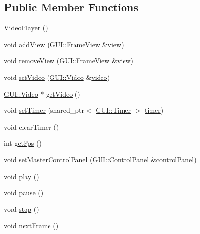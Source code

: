 \subsection*{Public Member Functions}
\begin{DoxyCompactItemize}
\item 
\hyperlink{classGUI_1_1VideoPlayer_af6d7bb082887f6a9738741778c58daf8}{Video\+Player} ()
\item 
void \hyperlink{classGUI_1_1VideoPlayer_a3a9a97f5648a0ddb20c3fcbf061e1986}{add\+View} (\hyperlink{classGUI_1_1FrameView}{G\+U\+I\+::\+Frame\+View} \&view)
\item 
void \hyperlink{classGUI_1_1VideoPlayer_acda9b8aac2ec150de169d44dff398597}{remove\+View} (\hyperlink{classGUI_1_1FrameView}{G\+U\+I\+::\+Frame\+View} \&view)
\item 
void \hyperlink{classGUI_1_1VideoPlayer_a0f9684c4ff31ee8fd5c381a433f56a6d}{set\+Video} (\hyperlink{classGUI_1_1Video}{G\+U\+I\+::\+Video} \&\hyperlink{classGUI_1_1VideoPlayer_a1c4d4daa00ecea5e8390244e057da0df}{video})
\item 
\hyperlink{classGUI_1_1Video}{G\+U\+I\+::\+Video} $\ast$ \hyperlink{classGUI_1_1VideoPlayer_ac9e30918a32b2e3ba7c86eb3f727c0d7}{get\+Video} ()
\item 
void \hyperlink{classGUI_1_1VideoPlayer_ad18697af7e7a6a82b354eb509fb57582}{set\+Timer} (shared\+\_\+ptr$<$ \hyperlink{classGUI_1_1Timer}{G\+U\+I\+::\+Timer} $>$ \hyperlink{classGUI_1_1VideoPlayer_a1653286e46cb3cc5ac65fd1d09d2a113}{timer})
\item 
void \hyperlink{classGUI_1_1VideoPlayer_ac99343fd51cdad1ee430905a00791ade}{clear\+Timer} ()
\item 
int \hyperlink{classGUI_1_1VideoPlayer_a519ad5c0664b9de28c1a6d9dc77f959d}{get\+Fps} ()
\item 
void \hyperlink{classGUI_1_1VideoPlayer_a84dd2c6952a37bd1e2d1582092606740}{set\+Master\+Control\+Panel} (\hyperlink{classGUI_1_1ControlPanel}{G\+U\+I\+::\+Control\+Panel} \&control\+Panel)
\item 
void \hyperlink{classGUI_1_1VideoPlayer_a6d58098c6cf63c241ed03bc797256bb1}{play} ()
\item 
void \hyperlink{classGUI_1_1VideoPlayer_a7167f5c196fc5e167bfabde1a730e81d}{pause} ()
\item 
void \hyperlink{classGUI_1_1VideoPlayer_a8c528baf37154d347366083f0f816846}{stop} ()
\item 
void \hyperlink{classGUI_1_1VideoPlayer_a365329da56f8b07f8c95027ba967bbc3}{next\+Frame} ()
\item 

\end{DoxyCompactItemize}
